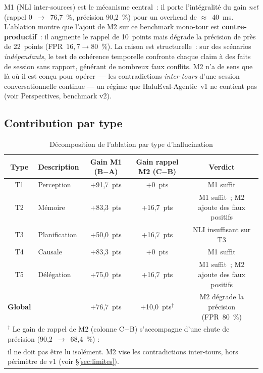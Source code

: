 \documentclass[12pt,a4paper]{article}
\begin{document}
M1 (NLI inter-sources) est le mécanisme central~: il porte l'intégralité du gain \emph{net} (rappel 0~$\to$~76,7~\%, précision 90,2~\%) pour un overhead de $\approx$~40~ms. L'ablation montre que l'ajout de M2 sur ce benchmark mono-tour est \textbf{contre-productif}~: il augmente le rappel de 10~points mais dégrade la précision de près de 22~points (FPR~$16{,}7 \to 80$~\%). La raison est structurelle~: sur des scénarios \emph{indépendants}, le test de cohérence temporelle confronte chaque claim à des faits de session sans rapport, générant de nombreux faux conflits. M2 n'a de sens que là où il est conçu pour opérer~--- les contradictions \emph{inter-tours} d'une session conversationnelle continue --- un régime que HaluEval-Agentic~v1 ne contient pas (voir Perspectives, benchmark v2).

\subsection{Contribution par type}

\begin{table}[H]
\centering
\caption{Décomposition de l'ablation par type d'hallucination}
\label{tab:ablation_by_type}
\renewcommand{\arraystretch}{1.25}
\begin{tabular}{clccc}
\toprule
\textbf{Type} & \textbf{Description} & \textbf{Gain M1 (B$-$A)} & \textbf{Gain rappel M2 (C$-$B)} & \textbf{Verdict} \\
\midrule
T1 & Perception     & +91,7~pts & +0~pts   & M1 suffit \\
T2 & Mémoire        & +83,3~pts & +16,7~pts & M1 suffit~; M2 ajoute des faux positifs \\
T3 & Planification  & +50,0~pts & +16,7~pts & NLI insuffisant sur T3 \\
T4 & Causale        & +83,3~pts & +0~pts   & M1 suffit \\
T5 & Délégation     & +75,0~pts & +16,7~pts & M1 suffit~; M2 ajoute des faux positifs \\
\midrule
\textbf{Global} & & +76,7~pts & +10,0~pts$^\dagger$ & M2 dégrade la précision (FPR~80~\%) \\
\bottomrule
\multicolumn{5}{l}{\small $^\dagger$ Le gain de rappel de M2 (colonne C$-$B) s'accompagne d'une chute de précision (90,2~$\to$~68,4~\%) :} \\
\multicolumn{5}{l}{\small \hspace{1.1em} il ne doit pas être lu isolément. M2 vise les contradictions inter-tours, hors périmètre de v1 (voir §\ref{sec:limites}).} \\
\end{tabular}
\end{table}
\end{document}
